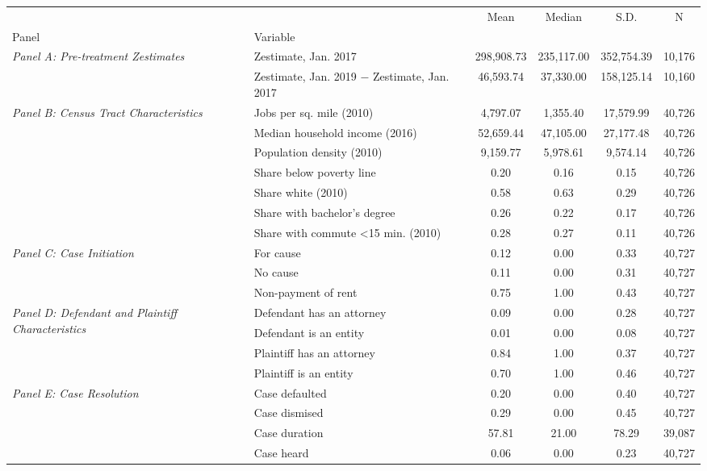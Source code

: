 \begin{tabular}{llcccc}
\toprule
 &  & Mean & Median & S.D. & N \\
Panel & Variable &  &  &  &  \\
\midrule
\multirow[c]{2}{3cm}{\textit{Panel A: Pre-treatment Zestimates}} & Zestimate, Jan. 2017 & 298,908.73 & 235,117.00 & 352,754.39 & 10,176 \\
 & Zestimate, Jan. 2019 $-$ Zestimate, Jan. 2017 & 46,593.74 & 37,330.00 & 158,125.14 & 10,160 \\
\cline{1-6}
\multirow[c]{7}{3cm}{\textit{Panel B: Census Tract Characteristics}} & Jobs per sq. mile (2010) & 4,797.07 & 1,355.40 & 17,579.99 & 40,726 \\
 & Median household income (2016) & 52,659.44 & 47,105.00 & 27,177.48 & 40,726 \\
 & Population density (2010) & 9,159.77 & 5,978.61 & 9,574.14 & 40,726 \\
 & Share below poverty line & 0.20 & 0.16 & 0.15 & 40,726 \\
 & Share white (2010) & 0.58 & 0.63 & 0.29 & 40,726 \\
 & Share with bachelor's degree & 0.26 & 0.22 & 0.17 & 40,726 \\
 & Share with commute <15 min. (2010) & 0.28 & 0.27 & 0.11 & 40,726 \\
\cline{1-6}
\multirow[c]{3}{3cm}{\textit{Panel C: Case Initiation}} & For cause & 0.12 & 0.00 & 0.33 & 40,727 \\
 & No cause & 0.11 & 0.00 & 0.31 & 40,727 \\
 & Non-payment of rent & 0.75 & 1.00 & 0.43 & 40,727 \\
\cline{1-6}
\multirow[c]{4}{3cm}{\textit{Panel D: Defendant and Plaintiff Characteristics}} & Defendant has an attorney & 0.09 & 0.00 & 0.28 & 40,727 \\
 & Defendant is an entity & 0.01 & 0.00 & 0.08 & 40,727 \\
 & Plaintiff has an attorney & 0.84 & 1.00 & 0.37 & 40,727 \\
 & Plaintiff is an entity & 0.70 & 1.00 & 0.46 & 40,727 \\
\cline{1-6}
\multirow[c]{6}{3cm}{\textit{Panel E: Case Resolution}} & Case defaulted & 0.20 & 0.00 & 0.40 & 40,727 \\
 & Case dismised & 0.29 & 0.00 & 0.45 & 40,727 \\
 & Case duration & 57.81 & 21.00 & 78.29 & 39,087 \\
 & Case heard & 0.06 & 0.00 & 0.23 & 40,727 \\

\end{tabular}

